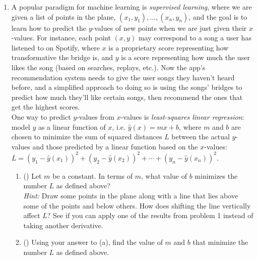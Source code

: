 \documentclass{article}
\begin{document}
\begin{enumerate} 
    \addtocounter{enumi}{2}

    \item A popular paradigm for machine learning is \textit{supervised learning}, where we are given a list of points in the plane, $(x_1,y_1),\dots,(x_n,y_n)$, and the goal is to learn how to predict the $y$-values of new points when we are just given their $x$-values. For instance, each point $(x,y)$ may correspond to a song a user has listened to on Spotify, where $x$ is a proprietary score representing how transformative the bridge is, and $y$ is a score representing how much the user likes the song (based on searches, replays, etc.). Now the app's recommendation system needs to give the user songs they haven't heard before, and a simplified approach to doing so is using the songs' bridges to predict how much they'll like certain songs, then recommend the ones that get the highest scores. \\

    One way to predict $y$-values from $x$-values is \textit{least-squares linear regression}: model $y$ as a linear function of $x$, i.e. $\hat{y}(x) = mx+b$, where $m$ and $b$ are chosen to minimize the sum of squared distances $L$ between the actual $y$-values and those predicted by a linear function based on the $x$-values: $L = (y_1-\hat{y}(x_1))^2 + (y_2-\hat{y}(x_2))^2 + \cdots + (y_n-\hat{y}(x_n))^2$.    

    \begin{enumerate}
        \item (\textasteriskcentered{}) Let $m$ be a constant. In terms of $m$, what value of $b$ minimizes the number $L$ as defined above? \\
        \textit{Hint:} Draw some points in the plane along with a line that lies above some of the points and below others. How does shifting the line vertically affect $L$? See if you can apply one of the results from problem 1 instead of taking another derivative. 

        \vfill

        \item (\textasteriskcentered{}) Using your answer to (a), find the value of $m$ and $b$ that minimize the number $L$ as defined above.

        \vfill
    \end{enumerate}

    \newpage


\end{enumerate}
\end{document}
